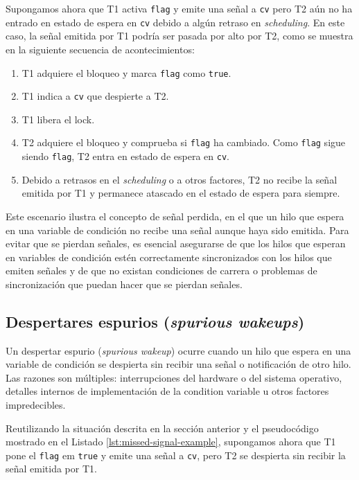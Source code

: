 Supongamos ahora que T1 activa \texttt{flag} y emite una señal a \texttt{cv} pero T2 aún no ha
entrado en estado de espera en \texttt{cv} debido a algún retraso en \textit{scheduling}. En este caso, la
señal emitida por T1 podría ser pasada por alto por T2, como se muestra en la siguiente
secuencia de acontecimientos:

\begin{enumerate}
      \item T1 adquiere el bloqueo y marca \texttt{flag} como \texttt{true}.
      \item T1 indica a \texttt{cv} que despierte a T2.
      \item T1 libera el lock.
      \item T2 adquiere el bloqueo y comprueba si \texttt{flag} ha cambiado. Como \texttt{flag} sigue siendo
            \texttt{flag}, T2 entra en estado de espera en \texttt{cv}.
      \item Debido a retrasos en el \textit{scheduling} o a otros factores, T2 no recibe la señal emitida por
            T1 y permanece atascado en el estado de espera para siempre.
\end{enumerate}

Este escenario ilustra el concepto de señal perdida, en el que un hilo que espera en una variable
de condición no recibe una señal aunque haya sido emitida. Para evitar que se pierdan
señales, es esencial asegurarse de que los hilos que esperan en variables de condición estén
correctamente sincronizados con los hilos que emiten señales y de que no existan condiciones
de carrera o problemas de sincronización que puedan hacer que se pierdan señales.

\subsection{Despertares espurios (\textit{spurious wakeups})}

Un despertar espurio (\textit{spurious wakeup}) ocurre cuando un hilo
que espera en una variable de condición se despierta sin recibir una señal o notificación de otro hilo.
Las razones son múltiples:
interrupciones del hardware o del sistema operativo, detalles internos de implementación de la
condition variable u otros factores impredecibles.

Reutilizando la situación descrita en la sección anterior y el pseudocódigo mostrado en el
Listado \ref{lst:missed-signal-example}, supongamos ahora que T1 pone el \texttt{flag} em \texttt{true} y emite una señal a \texttt{cv},
pero T2 se despierta sin recibir la señal emitida por T1.

